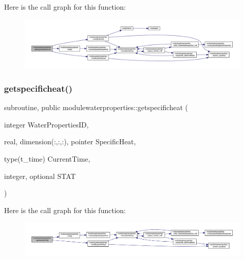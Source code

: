 Here is the call graph for this function\+:\nopagebreak
\begin{figure}[H]
\begin{center}
\leavevmode
\includegraphics[width=350pt]{namespacemodulewaterproperties_a900d2a5073201659f4476e350c5d728a_cgraph}
\end{center}
\end{figure}
\mbox{\label{namespacemodulewaterproperties_aa36e244423ac757e350a49437c3fb368}} 
\subsubsection{\texorpdfstring{getspecificheat()}{getspecificheat()}}
{\footnotesize\ttfamily subroutine, public modulewaterproperties\+::getspecificheat (\begin{DoxyParamCaption}\item[{integer}]{Water\+Properties\+ID,  }\item[{real, dimension(\+:,\+:,\+:), pointer}]{Specific\+Heat,  }\item[{type(t\+\_\+time)}]{Current\+Time,  }\item[{integer, optional}]{S\+T\+AT }\end{DoxyParamCaption})}

Here is the call graph for this function\+:\nopagebreak
\begin{figure}[H]
\begin{center}
\leavevmode
\includegraphics[width=350pt]{namespacemodulewaterproperties_aa36e244423ac757e350a49437c3fb368_cgraph}
\end{center}
\end{figure}
\mbox{\label{namespacemodulewaterproperties_af502ab70c7f5479a4e039154e3b7b099}} 
